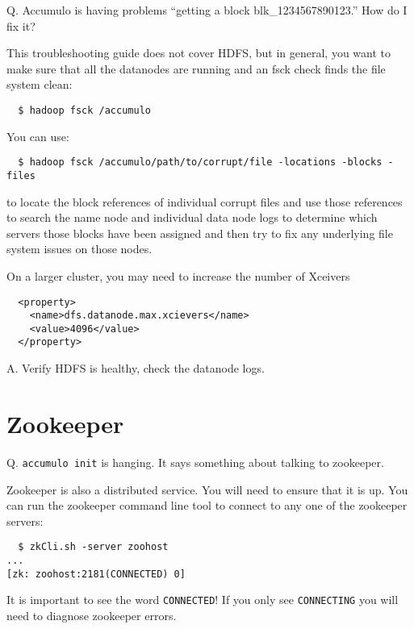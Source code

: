Q. Accumulo is having problems ``getting a block blk\_1234567890123.'' How do I fix it?

This troubleshooting guide does not cover HDFS, but in general, you
want to make sure that all the datanodes are running and an fsck check
finds the file system clean:

\begingroup\fontsize{8pt}{8pt}\selectfont\begin{verbatim}
  $ hadoop fsck /accumulo
\end{verbatim}\endgroup

You can use:

\begingroup\fontsize{8pt}{8pt}\selectfont\begin{verbatim}
  $ hadoop fsck /accumulo/path/to/corrupt/file -locations -blocks -files
\end{verbatim}\endgroup

to locate the block references of individual corrupt files and use those
references to search the name node and individual data node logs to determine which 
servers those blocks have been assigned and then try to fix any underlying file
system issues on those nodes.

On a larger cluster, you may need to increase the number of Xceivers

\begingroup\fontsize{8pt}{8pt}\selectfont\begin{verbatim}
  <property>
    <name>dfs.datanode.max.xcievers</name>
    <value>4096</value>
  </property>
\end{verbatim}\endgroup

A. Verify HDFS is healthy, check the datanode logs.

\section{Zookeeper}

Q. \texttt{accumulo init} is hanging.  It says something about talking to zookeeper.

Zookeeper is also a distributed service.  You will need to ensure that
it is up.  You can run the zookeeper command line tool to connect to
any one of the zookeeper servers:

\begingroup\fontsize{8pt}{8pt}\selectfont\begin{verbatim}
  $ zkCli.sh -server zoohost
...
[zk: zoohost:2181(CONNECTED) 0] 
\end{verbatim}\endgroup

It is important to see the word \texttt{CONNECTED}!  If you only see
\texttt{CONNECTING} you will need to diagnose zookeeper errors.

